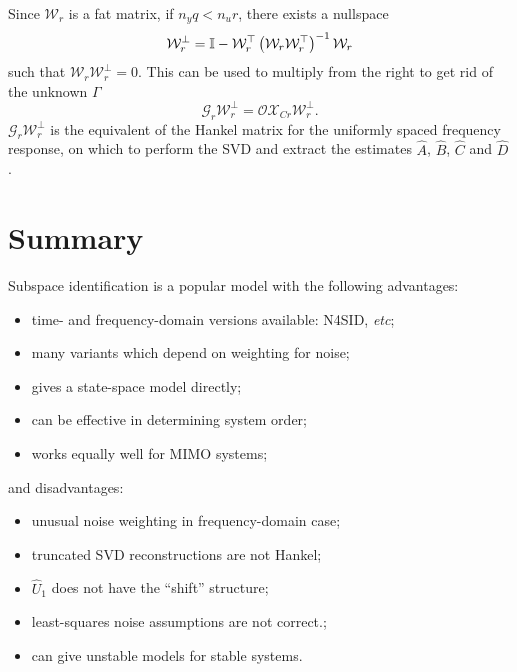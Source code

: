 Since $\mathcal{W}_r$ is a fat matrix, if $n_yq < n_ur$, there exists a nullspace
\begin{equation*}
  \mathcal{W}^\perp_r = \mathbb{I} - \mathcal{W}^\top_r\left(\mathcal{W}_r\mathcal{W}^\top_r\right)^{-1}\mathcal{W}_r
\end{equation*}
such that $\mathcal{W}_r\mathcal{W}^\perp_r = 0$. This can be used to multiply from the right to get rid of the unknown $\Gamma$
\begin{equation*}
  \mathcal{G}_r\mathcal{W}^\perp_r = \mathcal{O}\mathcal{X}_{Cr}\mathcal{W}^\perp_r.
\end{equation*}
$\mathcal{G}_r\mathcal{W}^\perp_r$ is the equivalent of the Hankel matrix for the uniformly spaced frequency response, on which to perform the SVD and extract the estimates $\hat{A}$, $\hat{B}$, $\hat{C}$ and $\hat{D}$.

\section{Summary}

Subspace identification is a popular model with the following advantages:
\begin{itemize}
\item time- and frequency-domain versions available: N4SID, \textit{etc};
\item many variants which depend on weighting for noise;
\item gives a state-space model directly;
\item can be effective in determining system order;
\item works equally well for MIMO systems;
\end{itemize}
and disadvantages:
\begin{itemize}
\item unusual noise weighting in frequency-domain case;
\item truncated SVD reconstructions are not Hankel;
\item $\hat{U}_1$ does not have the ``shift'' structure;
\item least-squares noise assumptions are not correct.;
\item can give unstable models for stable systems.
\end{itemize}

